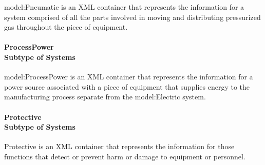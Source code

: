 \FloatBarrier

{model:Pneumatic} is an XML container that represents the information for a system comprised of all the parts involved in moving and distributing pressurized gas throughout the piece of equipment.

\paragraph[ProcessPower]{ProcessPower \\ {\small Subtype of Systems}}\mbox{}
  \label{type:ProcessPower}

\FloatBarrier

{model:ProcessPower} is an XML container that represents the information for a power source associated with a piece of equipment that supplies energy to the manufacturing process separate from the {model:Electric} system.

\paragraph[Protective]{Protective \\ {\small Subtype of Systems}}\mbox{}
  \label{type:Protective}

\FloatBarrier

Protective is an XML container that represents the information for those functions that detect or prevent harm or damage to equipment or personnel.

\FloatBarrier
